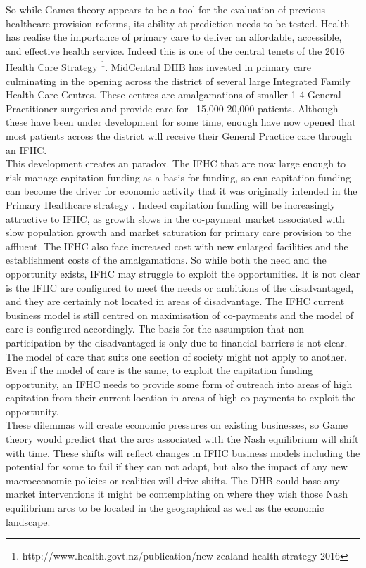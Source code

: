 \documentclass[11pt,a4paper]{article}
\begin{document}
So while Games theory appears to be a tool for the evaluation of previous healthcare provision reforms, its ability at prediction needs to be tested. Health has realise the importance of primary care to deliver an affordable, accessible, and effective health service. Indeed this is one of the central tenets of the 2016 Health Care Strategy \footnote{http://www.health.govt.nz/publication/new-zealand-health-strategy-2016}. MidCentral DHB has invested in primary care culminating in the opening across the district of several large Integrated Family Health Care Centres. These centres are amalgamations of smaller 1-4 General Practitioner surgeries and provide care for ~15,000-20,000 patients. Although these have been under development for some time, enough have now opened that most patients across the district will receive their General Practice care through an IFHC.\\

This development creates an paradox. The IFHC that are now large enough to risk manage capitation funding as a basis for funding, so can capitation funding can become the driver for economic activity that it was originally intended in the Primary Healthcare strategy \citep{king2001primary}. Indeed capitation funding will be increasingly attractive to IFHC, as growth slows in the co-payment market associated with slow population growth and market saturation for primary care provision to the affluent. The IFHC also face increased cost with new enlarged facilities and the establishment costs of the amalgamations. So while both the need and the opportunity exists, IFHC may struggle to exploit the opportunities. It is not clear is the IFHC are configured to meet the needs or ambitions of the disadvantaged, and they are certainly not located in areas of disadvantage. The IFHC current business model is still centred on maximisation of co-payments and the model of care is configured accordingly. The basis for the assumption that non-participation by the disadvantaged is only due to financial barriers is not clear. The model of care that suits one section of society might not apply to another. Even if the model of care is the same, to exploit the capitation funding opportunity, an IFHC needs to provide some form of outreach into areas of high capitation from their current location in areas of high co-payments to exploit the opportunity.\\

These dilemmas will create economic pressures on existing businesses, so Game theory would predict that the arcs associated with the Nash equilibrium will shift with time. These shifts will reflect changes in IFHC business models including the potential for some to fail if they can not adapt, but also the impact of any new macroeconomic policies or realities will drive shifts. The DHB could base any market interventions it might be contemplating on where they wish those Nash equilibrium arcs to be located in the geographical as well as the economic landscape.\\
\end{document}

